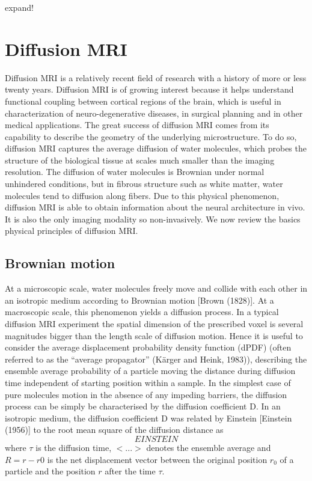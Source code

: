 expand!


\section{Diffusion MRI}
Diffusion MRI is a relatively recent field of research with a history of more or less twenty years. Diffusion MRI is of growing interest because it helps understand functional coupling between cortical regions of the brain, which is useful in characterization of neuro-degenerative diseases, in surgical planning and in other medical applications. The great success of diffusion MRI comes from its capability to describe the geometry of the underlying microstructure. To do so, diffusion MRI captures the average diffusion of water molecules, which probes the structure of the biological tissue at scales much smaller than the imaging resolution. The diffusion of water molecules is Brownian under normal unhindered conditions, but in fibrous structure such as white matter, water molecules tend to diffusion along fibers. Due to this physical phenomenon, diffusion MRI is able to obtain information about the neural architecture in vivo. It is also the only imaging modality so non-invasively. We now review the basics physical principles of diffusion MRI.

\subsection{Brownian motion}
At a microscopic scale, water molecules freely move and collide with each other in an isotropic medium according to Brownian motion [Brown (1828)]. At a macroscopic scale, this phenomenon yields a diffusion process. In a typical diffusion MRI experiment the spatial dimension of the prescribed voxel is several magnitudes bigger than the length scale of diffusion motion. Hence it is useful to consider the average displacement probability density function (dPDF) (often referred to as the “average propagator” (Kärger and Heink, 1983)), describing the ensemble average probability of a particle moving the distance  during diffusion time  independent of starting position  within a sample. In the simplest case of pure molecules motion in the absence of any impeding barriers, the diffusion process can be simply be characterised by the diffusion coefficient D\citep{Fick}. In an isotropic medium, the diffusion coefficient D was related by Einstein [Einstein (1956)] to the root mean square of the diffusion distance as
\begin{equation}
	EINSTEIN
\end{equation}
where $\tau$ is the diffusion time, $<...>$ denotes the ensemble average and $R = r − r0$ is the net displacement vector between the original position $r_0$ of a particle and the position $r$ after the time $\tau$. 

